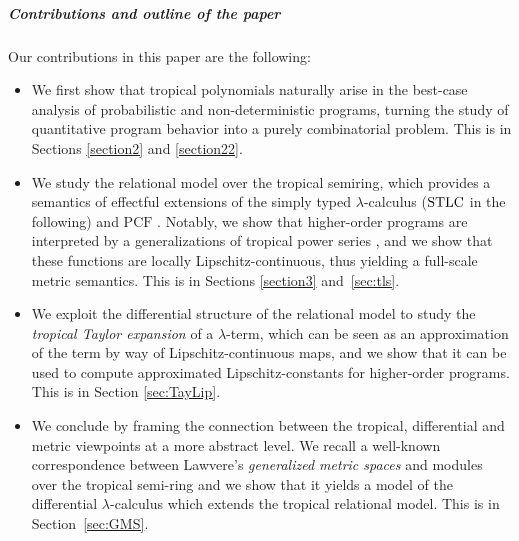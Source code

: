 \subparagraph*{Contributions and outline of the paper}


Our contributions in this paper are the following:
\begin{itemize}

\item We first show that tropical polynomials naturally arise in the {best-case} analysis of probabilistic and non-deterministic programs, turning the study of quantitative program behavior into a purely combinatorial problem. This is in Sections \ref{section2} and \ref{section22}.

\item We study the relational model over the tropical semiring, which provides a semantics of effectful extensions of the simply typed $\lambda$-calculus ($\mathrm{STLC}$ in the following) and $\mathrm{PCF}$ \cite{Plotkin1977}. Notably, 
 we show that higher-order programs are interpreted by a  
generalizations of {tropical power series} \cite{Porzio2021}, and we show that these functions are locally Lipschitz-continuous, thus yielding a full-scale metric semantics. This is in Sections \ref{section3} and~\ref{sec:tls}.
 
 \item We exploit the differential structure of the relational model to study the \emph{tropical Taylor expansion} of a $\lambda$-term, which can be seen as an approximation of the term by way of Lipschitz-continuous maps, and we show that it can be used to compute approximated Lipschitz-constants for higher-order programs.
This is in Section \ref{sec:TayLip}.



\item We conclude 
by framing the connection between the 
tropical, differential and metric viewpoints at a more abstract level.
We recall a well-known correspondence between Lawvere's \emph{generalized metric spaces} \cite{Lawvere1973, Stubbe2014} and modules over the tropical semi-ring \cite{Russo2007} and we show that it yields a model of the differential $\lambda$-calculus which extends the tropical relational model. This is in Section~\ref{sec:GMS}.
\end{itemize}
